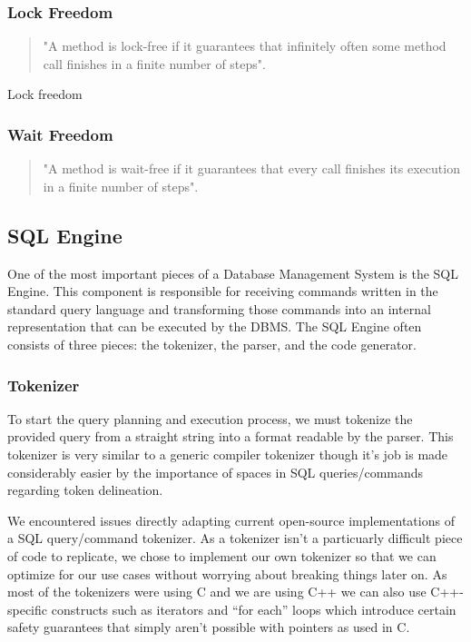 \documentclass[letterpaper, 12pt]{article}
\renewcommand{\includegraphics}[2][]{\fbox{}}
\begin{document}
\subsubsection{Lock Freedom}
\begin{quotation}
	"A method is lock-free if it guarantees that infinitely often some method call finishes in a finite number of steps"\citep[p. 60]{artofmulti}.
\end{quotation}

Lock freedom 

\subsubsection{Wait Freedom}
\begin{quotation}
	"A method is wait-free if it guarantees that every call finishes its execution
	in a finite number of steps"\citep[p. 59]{artofmulti}.
\end{quotation}

\newpage


\subsection{SQL Engine}
One of the most important pieces of a Database Management System is the SQL Engine. 
This component is responsible for receiving commands written in the standard query
language and transforming those commands into an internal representation that can be
executed by the DBMS. The SQL Engine often consists of three pieces: the tokenizer, the
parser, and the code generator.


\subsubsection{Tokenizer}
To start the query planning and execution process, we must tokenize the provided query
from a straight string into a format readable by the parser. This tokenizer is very
similar to a generic compiler tokenizer though it's job is made considerably easier 
by the importance of spaces in SQL queries/commands regarding token delineation.
\par\vspace{\baselineskip}
We encountered issues directly adapting current open-source implementations of a
SQL query/command tokenizer. As a tokenizer isn't a particuarly difficult piece of 
code to replicate, we chose to implement our own tokenizer so that
we can optimize for our use cases without worrying about breaking things later on.
As most of the tokenizers were using C and we are using C++ we can also use C++-specific
constructs such as iterators and ``for each'' loops which introduce certain safety guarantees 
that simply aren't possible with pointers as used in C.
\end{document}
